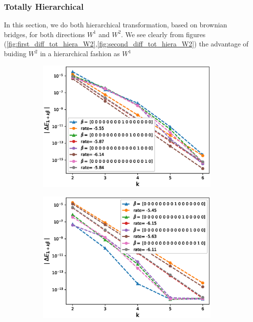\documentclass[11pt]{article}
\begin{document}
\subsubsection{Totally Hierarchical}
In this section, we do both hierarchical transformation, based on brownian bridges, for both directions $W^1$ and $W^2$. We see clearly from figures (\ref{fig:first_diff_tot_hiera_W2},\ref{fig:second_diff_tot_hiera_W2}) the advantage of buiding  $W^2$ in a hierarchical fashion as $W^1$ 


\begin{figure}[h!]
	\centering
	\begin{subfigure}{.5\textwidth}
		\centering
		\includegraphics[width=1\linewidth]{./figures/effect_H_differences/hierarchical/H_007/N_8/first_difference_rbergomi_8steps_H_007_K_1_hierarch_with_rate_W2.eps}
		\caption{}
		\label{fig:sub3}
	\end{subfigure}%
	\begin{subfigure}{.5\textwidth}
		\centering
		\includegraphics[width=1\linewidth]{./figures/effect_H_differences/total_hierarchical/first_difference_rbergomi_8steps_H_007_K_1_totally_hierarch_with_rate_W2}
		\caption{}
		\label{fig:sub4}
	\end{subfigure}
	

\end{figure}
\end{document}
